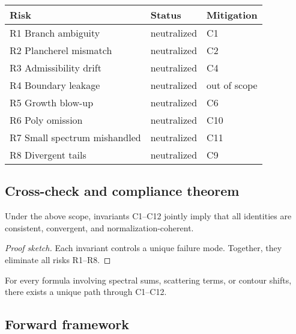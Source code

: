 \begin{center}
\renewcommand{\arraystretch}{1.15}
\begin{tabular}{lll}
\toprule
\textbf{Risk} & \textbf{Status} & \textbf{Mitigation} \\
\midrule
R1 Branch ambiguity & neutralized & C1 \\
R2 Plancherel mismatch & neutralized & C2 \\
R3 Admissibility drift & neutralized & C4 \\
R4 Boundary leakage & neutralized & out of scope \\
R5 Growth blow-up & neutralized & C6 \\
R6 Poly omission & neutralized & C10 \\
R7 Small spectrum mishandled & neutralized & C11 \\
R8 Divergent tails & neutralized & C9 \\
\bottomrule
\end{tabular}
\end{center}

\subsection{Cross-check and compliance theorem}

\begin{theorem}
Under the above scope, invariants C1–C12 jointly imply that all identities
are consistent, convergent, and normalization-coherent.  
\end{theorem}

\begin{proof}[Proof sketch]
Each invariant controls a unique failure mode.  
Together, they eliminate all risks R1–R8.  
\end{proof}

\begin{lemma}
For every formula involving spectral sums, scattering terms, or contour shifts,
there exists a unique path through C1–C12.  
\end{lemma}

\subsection{Forward framework}

